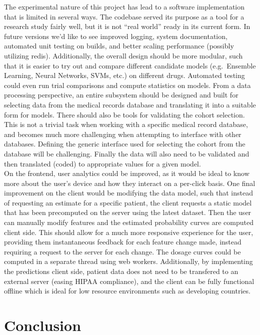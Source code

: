 \documentclass[12pt,a4paper,]{report}
\begin{document}
The experimental nature of this project has lead to a software
implementation that is limited in several ways. The codebase served its
purpose as a tool for a research study fairly well, but it is not ``real
world'' ready in its current form. In future versions we'd like to see
improved logging, system documentation, automated unit testing on
builds, and better scaling performance (possibly utilizing redis).
Additionally, the overall design should be more modular, such that it is
easier to try out and compare different candidate models (e.g.~Ensemble
Learning, Neural Networks, SVMs, etc.) on different drugs. Automated
testing could even run trial comparisons and compute statistics on
models. From a data processing perspective, an entire subsystem should
be designed and built for selecting data from the medical records
database and translating it into a suitable form for models. There
should also be tools for validating the cohort selection. This is not a
trivial task when working with a specific medical record database, and
becomes much more challenging when attempting to interface with other
databases. Defining the generic interface used for selecting the cohort
from the database will be challenging. Finally the data will also need
to be validated and then translated (coded) to appropriate values for a
given model.\\
On the frontend, user analytics could be improved, as it would be ideal
to know more about the user's device and how they interact on a
per-click basis. One final improvement on the client would be modifying
the data model, such that instead of requesting an estimate for a
specific patient, the client requests a static model that has been
precomputed on the server using the latest dataset. Then the user can
manually modify features and the estimated probability curves are
computed client side. This should allow for a much more responsive
experience for the user, providing them instantaneous feedback for each
feature change made, instead requiring a request to the server for each
change. The dosage curves could be computed in a separate thread using
web workers. Additionally, by implementing the predictions client side,
patient data does not need to be transfered to an external server
(easing HIPAA compliance), and the client can be fully functional
offline which is ideal for low resource environments such as developing
countries.

\chapter{Conclusion}\label{conclusion}
\end{document}
